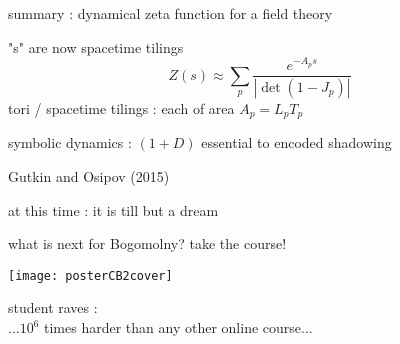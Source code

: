 \begin{frame}{summary : dynamical zeta function for a field theory}
\begin{block}{"\po s" are now spacetime tilings}
\[
Z(s) \approx
\sum_{p} \frac{e^{-A_p s}}
              {\left|\det(1-J_p)\right|}
\]
tori / spacetime tilings :
each of area $A_p = L_p T_p$
\end{block}
\begin{block}{symbolic dynamics : $(1+D)$\dmn}
essential to encoded shadowing

\hfill Gutkin and Osipov (2015)
\end{block}

\vfill
at this time : it is till but a dream
\end{frame}


\begin{frame}{what is next for Bogomolny? take the course!}
\begin{center}
\texttt{[image: posterCB2cover]}
\end{center}
\vfill
student raves : \\
...$10^6$ times harder than any other online course...
\end{frame}




